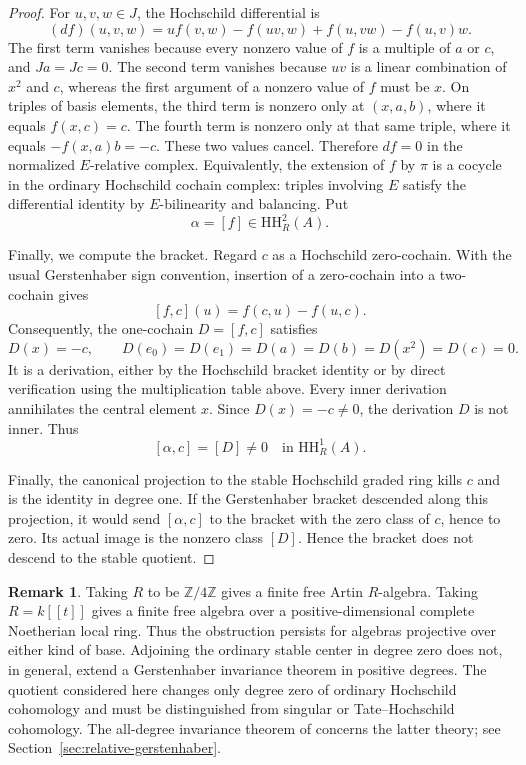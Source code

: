 \documentclass[12pt,a4paper,english,reqno]{amsart}
\numberwithin{equation}{section}
\theoremstyle{plain}
\theoremstyle{definition}
\newtheorem{remark}[theorem]{Remark}
\begin{document}
\begin{proof}
For $u,v,w\in J$, the Hochschild differential is
\[
 (df)(u,v,w)
 =u f(v,w)-f(uv,w)+f(u,vw)-f(u,v)w.
\]
The first term vanishes because every nonzero value of $f$ is a
multiple of $a$ or $c$, and $Ja=Jc=0$.  The second term vanishes
because $uv$ is a linear combination of $x^2$ and $c$, whereas the
first argument of a nonzero value of $f$ must be $x$.  On triples of
basis elements, the third term is nonzero only at $(x,a,b)$, where it
equals $f(x,c)=c$.  The fourth term is nonzero only at that same
triple, where it equals $-f(x,a)b=-c$.  These two values cancel.
Therefore $df=0$ in the normalized $E$-relative complex.  Equivalently,
the extension of $f$ by $\pi$ is a cocycle in the ordinary Hochschild
cochain complex: triples involving $E$ satisfy the differential
identity by $E$-bilinearity and balancing.  Put
\[
 \alpha=[f]\in\mathrm{HH}^{2}_R(A).
\]

Finally, we compute the bracket.  Regard $c$ as a Hochschild
zero-cochain.  With the usual Gerstenhaber
sign convention, insertion of a zero-cochain into a two-cochain gives
\[
 [f,c](u)=f(c,u)-f(u,c).
\]
Consequently, the one-cochain $D=[f,c]$ satisfies
\[
 D(x)=-c,
 \qquad
 D(e_0)=D(e_1)=D(a)=D(b)=D(x^2)=D(c)=0.
\]
It is a derivation, either by the Hochschild bracket identity or by
direct verification using the multiplication table above.  Every
inner derivation annihilates the central element $x$.  Since
$D(x)=-c\ne0$, the derivation $D$ is not inner.  Thus
\[
 [\alpha,c]=[D]\ne0
 \quad\text{in }\mathrm{HH}^{1}_R(A).
\]

Finally, the canonical projection to the stable Hochschild graded
ring kills $c$ and is the identity in degree one.  If the Gerstenhaber
bracket descended along this projection, it would send
$[\alpha,c]$ to the bracket with the zero class of $c$, hence to
zero.  Its actual image is the nonzero class $[D]$.  Hence the bracket does not descend to the stable quotient.
\end{proof}

\begin{remark}
\label{rem:positive-range-essential}
Taking $R$ to be $\mathbb Z/4\mathbb Z$ gives a finite free Artin
$R$-algebra.  Taking $R=k[[t]]$ gives a finite free algebra over a
positive-dimensional complete Noetherian local ring.  Thus the
obstruction persists for algebras projective over either kind of
base.  Adjoining the ordinary stable center in degree zero does
not, in general, extend a Gerstenhaber invariance theorem in
positive degrees.
The quotient considered here changes only degree zero of ordinary
Hochschild cohomology and must be distinguished from singular or
Tate--Hochschild cohomology.  The all-degree invariance theorem of
\cite{Wang2021Gerstenhaber} concerns the latter theory; see
Section~\ref{sec:relative-gerstenhaber}.
\end{remark}
\end{document}
